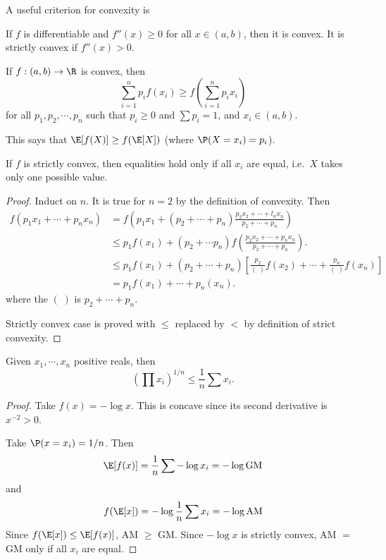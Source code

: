\documentclass[a4paper]{article}
\begin{document}
A useful criterion for convexity is
\begin{prop}
  If $f$ is differentiable and $f''(x) \geq 0$ for all $x\in (a, b)$, then it is convex. It is strictly convex if $f''(x) > 0$.
\end{prop}

\begin{thm}
  If $f:(a, b) \to \R$ is convex, then
  \[
    \sum_{i = 1}^n p_i f(x_i) \geq f\left(\sum_{i = 1}^n p_ix_i\right)
  \]
  for all $p_1, p_2, \cdots, p_n$ such that $p_i \geq 0$ and $\sum p_i = 1$, and $x_i \in (a, b)$.

  This says that $\E[f(X)] \geq f(\E[X])$ (where $\P(X=x_i) = p_i$).

  If $f$ is strictly convex, then equalities hold only if all $x_i$ are equal, i.e.\ $X$ takes only one possible value.
\end{thm}

\begin{proof}
  Induct on $n$. It is true for $n = 2$ by the definition of convexity. Then
  \begin{align*}
    f(p_1x_1 + \cdots + p_nx_n) &= f\left(p_1x_1 + (p_2 + \cdots + p_n)\frac{p_2x_2 + \cdots + l_nx_n}{p_2 + \cdots + p_n}\right)\\
    &\leq p_1f(x_1) + (p_2 + \cdots p_n)f\left(\frac{p_2x_2 + \cdots + p_n x_n}{p_2 + \cdots + p_n }\right).\\
    &\leq p_1f(x_1) + (p_2 + \cdots + p_n)\left[\frac{p_2}{(\;)}f(x_2) + \cdots + \frac{p_n}{(\;)}f(x_n)\right]\\
    &= p_1f(x_1) + \cdots + p_n(x_n).
  \end{align*}
  where the $(\;)$ is $p_2 + \cdots + p_n$.

  Strictly convex case is proved with $\leq$ replaced by $<$ by definition of strict convexity.
\end{proof}

\begin{cor}[AM-GM inequality]
  Given $x_1, \cdots, x_n$ positive reals, then
  \[
    \left(\prod x_i\right)^{1/n} \leq \frac{1}{n}\sum x_i.
  \]
\end{cor}

\begin{proof}
  Take $f(x) = -\log x$. This is concave since its second derivative is $x^{-2} > 0$.

  Take $\P(x = x_i) = 1/n$. Then
  \[
    \E[f(x)] = \frac{1}{n}\sum -\log x_i = -\log \text{GM}
  \]
  and
  \[
    f(\E[x]) = -\log \frac{1}{n}\sum x_i = -\log\text{AM}
  \]
  Since $f(\E[x]) \leq \E[f(x)]$, AM $\geq$ GM. Since $-\log x$ is strictly convex, AM $=$ GM only if all $x_i$ are equal.
\end{proof}
\end{document}
